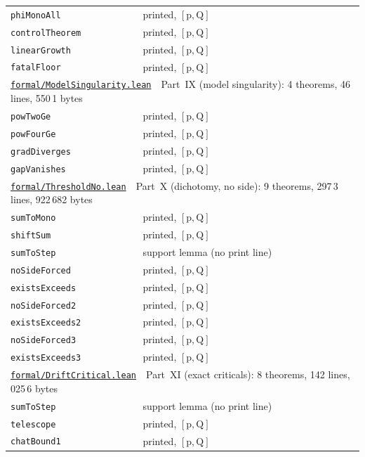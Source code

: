 \documentclass[11pt]{article}
\theoremstyle{plain}
\theoremstyle{definition}
\begin{document}
\begin{longtable}{p{} p{}}
\quad\texttt{phiMonoAll} & printed, $[\mathrm{p},\mathrm{Q}]$\\
\quad\texttt{controlTheorem} & printed, $[\mathrm{p},\mathrm{Q}]$\\
\quad\texttt{linearGrowth} & printed, $[\mathrm{p},\mathrm{Q}]$\\
\quad\texttt{fatalFloor} & printed, $[\mathrm{p},\mathrm{Q}]$\\
\hline
\multicolumn{2}{l}{\hyperref[sec:control]{\texttt{formal/ModelSingularity.lean}}\ \ Part~IX (model singularity): 4 theorems, 46 lines, 550\,1 bytes}\\
\quad\texttt{powTwoGe} & printed, $[\mathrm{p},\mathrm{Q}]$\\
\quad\texttt{powFourGe} & printed, $[\mathrm{p},\mathrm{Q}]$\\
\quad\texttt{gradDiverges} & printed, $[\mathrm{p},\mathrm{Q}]$\\
\quad\texttt{gapVanishes} & printed, $[\mathrm{p},\mathrm{Q}]$\\
\hline
\multicolumn{2}{l}{\hyperref[sec:sharp]{\texttt{formal/ThresholdNo.lean}}\ \ Part~X (dichotomy, no side): 9 theorems, 297\,3 lines, 922\,682 bytes}\\
\quad\texttt{sumToMono} & printed, $[\mathrm{p},\mathrm{Q}]$\\
\quad\texttt{shiftSum} & printed, $[\mathrm{p},\mathrm{Q}]$\\
\quad\texttt{sumToStep} & support lemma (no print line)\\
\quad\texttt{noSideForced} & printed, $[\mathrm{p},\mathrm{Q}]$\\
\quad\texttt{existsExceeds} & printed, $[\mathrm{p},\mathrm{Q}]$\\
\quad\texttt{noSideForced2} & printed, $[\mathrm{p},\mathrm{Q}]$\\
\quad\texttt{existsExceeds2} & printed, $[\mathrm{p},\mathrm{Q}]$\\
\quad\texttt{noSideForced3} & printed, $[\mathrm{p},\mathrm{Q}]$\\
\quad\texttt{existsExceeds3} & printed, $[\mathrm{p},\mathrm{Q}]$\\
\hline
\multicolumn{2}{l}{\hyperref[sec:critical]{\texttt{formal/DriftCritical.lean}}\ \ Part~XI (exact criticals): 8 theorems, 142 lines, 025\,6 bytes}\\
\quad\texttt{sumToStep} & support lemma (no print line)\\
\quad\texttt{telescope} & printed, $[\mathrm{p},\mathrm{Q}]$\\
\quad\texttt{chatBound1} & printed, $[\mathrm{p},\mathrm{Q}]$\\

\end{longtable}
\end{document}
